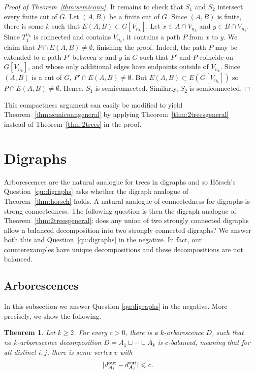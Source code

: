 \documentclass[11pt, reqno, a4paper]{article}
\newtheorem{theorem}{Theorem}
\theoremstyle{definition}
\numberwithin{equation}{section}
\renewcommand{\leq}{\leqslant}
\renewcommand{\geq}{\geqslant}
\begin{document}
\begin{proof}[Proof of Theorem~\ref{thm:semiconn}]
It remains to check that $S_1$ and $S_2$ intersect every finite cut of $G$.
Let $(A,B)$ be a finite cut of $G$.
Since $(A,B)$ is finite, there is some $k$ such that $E(A,B)\subset G[V_{n_k}]$.
Let $x\in A\cap V_{n_k}$ and $y\in B\cap V_{n_k}$.
Since $T_1^{n_k}$ is connected and contains $V_{n_k}$, it contains a path $P$ from $x$ to $y$. 
We claim that $P\cap E(A,B)\neq \emptyset$, finishing the proof.
Indeed, the path $P$ may be extended to a path $P'$ between $x$ and $y$ in $G$ such that $P'$ and $P$ coincide on $G[V_{n_k}]$, and whose only additional edges have endpoints outside of $V_{n_k}$.
Since $(A,B)$ is a cut of $G$, $P'\cap E(A,B)\neq \emptyset$.
But $E(A,B) \subset E(G[V_{n_k}])$ so $P\cap E(A,B)\neq \emptyset$.
Hence, $S_1$ is semiconnected.
Similarly, $S_2$ is semiconnected.
\end{proof}
This compactness argument can easily be modified to yield Theorem~\ref{thm:semiconngeneral} 
by applying Theorem~\ref{thm:2treesgeneral} instead of Theorem~\ref{thm:2trees} in the proof.

\section{Digraphs}\label{sec:digraphs}

Arborescences are the natural analogue for trees in digraphs and so H\"{o}rsch's Question~\ref{qu:digraphs} asks whether the digraph analogue of Theorem~\ref{thm:horsch} holds. A natural analogue of connectedness for digraphs is strong connectedness. The following question is then the digraph analogue of Theorem~\ref{thm:2treesgeneral}:
does any union of two strongly connected digraphs allow a balanced decomposition into two strongly connected digraphs?
We answer both this and Question~\ref{qu:digraphs} in the negative. In fact, our counterexamples have unique decompositions and these decompositions are not balanced.
\subsection{Arborescences}\label{sec:arbor}
In this subsection we answer Question \ref{qu:digraphs} in the negative.
More precisely, we show the following.
\begin{theorem}\label{conj:karb}
Let $k \geq 2$.
For every $c>0$, there is a $k$-arborescence $D$,
such that no \mbox{$k$-arborescence} decomposition $D= A_1\sqcup \dotsb \sqcup A_k$ is $c$-balanced,
meaning that for all distinct $i, j$, there is some vertex $v$ with 
\begin{equation*}
    |d^{\textup{out}}_{A_i} - d^{\textup{out}}_{A_j}| \leq c.
\end{equation*}
\end{theorem}
\end{document}
